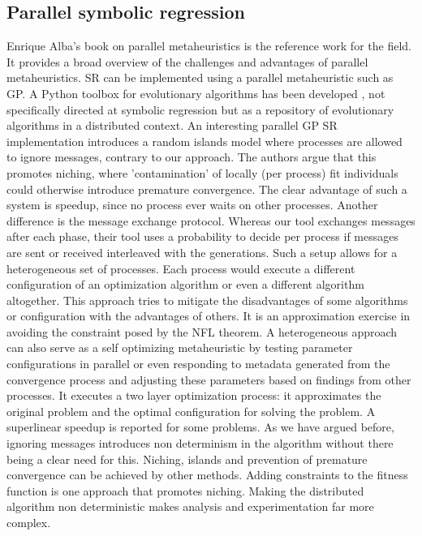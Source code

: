 \subsection{Parallel symbolic regression}
Enrique Alba's book \cite{parallelmetaheuristics} on parallel metaheuristics is the reference work for the field. It provides a broad overview of the challenges and advantages of parallel metaheuristics.  SR can be implemented using a parallel metaheuristic such as GP.
A Python toolbox for evolutionary algorithms has been developed \citep{DEAP}, not specifically directed at symbolic regression but as a repository of evolutionary algorithms in a distributed context.
An interesting parallel GP SR implementation \citep{DGPSR} introduces a random islands model where processes are allowed to ignore messages, contrary to our approach. The authors argue that this promotes niching, where 'contamination' of locally (per process) fit individuals could otherwise introduce premature convergence. The clear advantage of such a system is speedup, since no process ever waits on other processes. Another difference is the message exchange protocol. Whereas our tool exchanges messages after each phase, their tool uses a probability to decide per process if messages are sent or received interleaved with the generations. Such a setup allows for a heterogeneous set of processes.
Each process would execute a different configuration of an optimization algorithm or even a different algorithm altogether.
This approach tries to mitigate the disadvantages of some algorithms or configuration with the advantages of others. It is an approximation exercise in avoiding the constraint posed by the NFL theorem. A heterogeneous approach can also serve as a self optimizing metaheuristic by testing parameter configurations in parallel or even responding to metadata generated from the convergence process and adjusting these parameters based on findings from other processes. It executes a two layer optimization process: it approximates the original problem and the optimal configuration for solving the problem. %
A superlinear speedup is reported for some problems. As we have argued before, ignoring messages introduces non determinism in the algorithm without there being a clear need for this. Niching, islands and prevention of premature convergence can be achieved by other methods. Adding constraints to the fitness function is one approach that promotes niching. Making the distributed algorithm non deterministic makes analysis and experimentation far more complex. 
